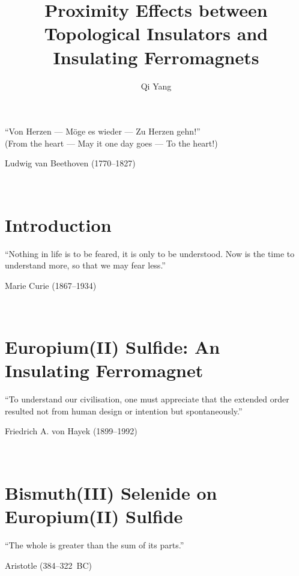 ﻿\documentclass{report}
\begin{document}
\title{Proximity Effects between Topological Insulators and Insulating Ferromagnets}
\author{Qi Yang}


\keepXColumns

\beforepreface
%
    
%
\chapter*{}
    
%
\epigraph{``Von Herzen --- M\"oge es wieder --- Zu Herzen gehn!''\\(From the heart --- May it one day goes --- To the heart!)}{Ludwig van Beethoven (1770--1827)}~\\
    
%
\afterpreface
\captionsetup{width=0.95\columnwidth}%
%
\chapter{Introduction}\label{ch:intro}
\epigraph{``Nothing in life is to be feared, it is only to be understood. Now is the time to understand more, so that we may fear less.''}{Marie Curie (1867--1934)}~\\
    
%
%
\chapter{Europium(II) Sulfide: An Insulating Ferromagnet}\label{ch:EuS}
\epigraph{``To understand our civilisation, one must appreciate that the extended order resulted not from human design or intention but spontaneously.''}{Friedrich A. von Hayek (1899--1992)}~\\
    

\chapter{Bismuth(III) Selenide on Europium(II) Sulfide}\label{ch:bilayer2014}
\epigraph{``The whole is greater than the sum of its parts.''}{Aristotle (384--322~BC)}~\\
    
\end{document}
